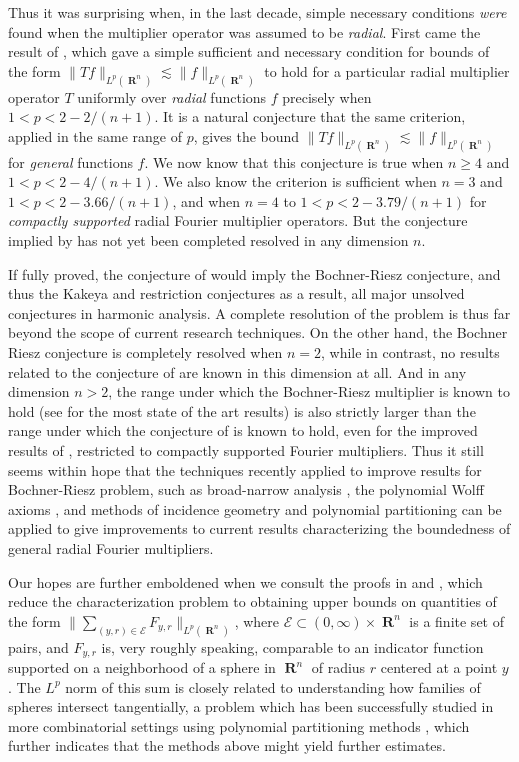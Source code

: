 \documentclass[12pt]{article}
\DeclareMathOperator{\RR}{\mathbf{R}}
\theoremstyle{plain}
\theoremstyle{remark}
\theoremstyle{definition}
\begin{document}
Thus it was surprising when, in the last decade, simple necessary conditions \emph{were} found when the multiplier operator was assumed to be \emph{radial}. First came the result of \cite{GarrigosandSeeger}, which gave a simple sufficient and necessary condition for bounds of the form $\| Tf \|_{L^p(\RR^n)} \lesssim \| f \|_{L^p(\RR^n)}$ to hold for a particular radial multiplier operator $T$ uniformly over \emph{radial} functions $f$ precisely when $1 < p < 2 - 2/(n+1)$. It is a natural conjecture that the same criterion, applied in the same range of $p$, gives the bound $\| Tf \|_{L^p(\RR^n)} \lesssim \| f \|_{L^p(\RR^n)}$ for \emph{general} functions $f$. We now know \cite{HeoandNazarovandSeeger} that this conjecture is true when $n \geq 4$ and $1 < p < 2 - 4/(n+1)$. We also know \cite{Cladek} the criterion is sufficient when $n = 3$ and $1 < p < 2 - 3.66/(n+1)$, and when $n = 4$ to $1 < p < 2 - 3.79/(n+1)$ for \emph{compactly supported} radial Fourier multiplier operators. But the conjecture implied by \cite{GarrigosandSeeger} has not yet been completed resolved in any dimension $n$.

If fully proved, the conjecture of \cite{GarrigosandSeeger} would imply the Bochner-Riesz conjecture, and thus the Kakeya and restriction conjectures as a result, all major unsolved conjectures in harmonic analysis. A complete resolution of the problem is thus far beyond the scope of current research techniques. On the other hand, the Bochner Riesz conjecture is completely resolved when $n = 2$, while in contrast, no results related to the conjecture of \cite{GarrigosandSeeger} are known in this dimension at all. And in any dimension $n > 2$, the range under which the Bochner-Riesz multiplier is known to hold (see \cite{GuoandOhandWangandWuandZhang} for the most state of the art results) is also strictly larger than the range under which the conjecture of \cite{GarrigosandSeeger} is known to hold, even for the improved results of \cite{Cladek}, restricted to compactly supported Fourier multipliers. Thus it still seems within hope that the techniques recently applied to improve results for Bochner-Riesz problem, such as broad-narrow analysis \cite{BourgainandGuth}, the polynomial Wolff axioms \cite{KatzandRogers}, and methods of incidence geometry and polynomial partitioning \cite{GuthTextbook} can be applied to give improvements to current results characterizing the boundedness of general radial Fourier multipliers.

Our hopes are further emboldened when we consult the proofs in \cite{HeoandNazarovandSeeger} and \cite{Cladek}, which reduce the characterization problem to obtaining upper bounds on quantities of the form $\| \sum_{(y,r) \in \mathcal{E}} F_{y,r} \|_{L^p(\RR^n)}$, where $\mathcal{E} \subset (0,\infty) \times \RR^n$ is a finite set of pairs, and $F_{y,r}$ is, very roughly speaking, comparable to an indicator function supported on a neighborhood of a sphere in $\RR^n$ of radius $r$ centered at a point $y$. The $L^p$ norm of this sum is closely related to understanding how families of spheres intersect tangentially, a problem which has been successfully studied in more combinatorial settings using polynomial partitioning methods \cite{Zahl}, which further indicates that the methods above might yield further estimates.
\end{document}
